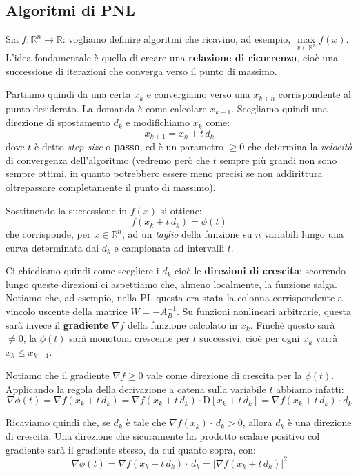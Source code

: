 \documentclass[a4paper,11pt]{article}
\begin{document}
\subsection{Algoritmi di PNL}
Sia $f: \mathbb{R}^n \rightarrow \mathbb{R}$: vogliamo definire algoritmi che ricavino, ad esempio, $\max\limits_{x \in \mathbb{R}^n} f(x)$.
L'idea fondamentale è quella di creare una \textbf{relazione di ricorrenza}, cioè una successione di iterazioni che converga verso il punto di massimo.

Partiamo quindi da una certa $x_k$ e convergiamo verso una $x_{k+n}$ corrispondente al punto desiderato.
La domanda è come calcolare $x_{k+1}$.
Scegliamo quindi una direzione di spostamento $d_k$ e modifichiamo $x_k$ come:
$$
x_{k + 1} = x_k + t \, d_k 
$$
dove $t$ è detto \textit{step size} o \textbf{passo}, ed è un parametro $\geq 0$ che determina la \textit{velocità} di convergenza dell'algoritmo (vedremo però che $t$ sempre più grandi non sono sempre ottimi, in quanto potrebbero essere meno precisi se non addirittura oltrepassare completamente il punto di massimo).

Sostituendo la successione in $f(x)$ si ottiene:
$$
f(x_k + t \, d_k) = \phi(t)
$$
che corrisponde, per $x \in \mathbb{R}^n$, ad un \textit{taglio} della funzione su $n$ variabili lungo una curva determinata dai $d_k$ e campionata ad intervalli $t$.

Ci chiediamo quindi come scegliere i $d_k$ cioè le \textbf{direzioni di crescita}: scorrendo lungo queste direzioni ci aspettiamo che, almeno localmente, la funzione salga.
Notiamo che, ad esempio, nella PL questa era stata la colonna corrispondente a vincolo uscente della matrice $W = -A_B^{-1}$. 
Su funzioni nonlineari arbitrarie, questa sarà invece il \textbf{gradiente} $\nabla f$ della funzione calcolato in $x_k$.
Finchè questo sarà $\neq 0$, la $\phi(t)$ sarà monotona crescente per $t$ successivi, cioè per ogni $x_k$ varrà $x_k \leq x_{k+1}$.

Notiamo che il gradiente $\nabla f \geq 0$ vale come direzione di crescita per la $\phi(t)$.
Applicando la regola della derivazione a catena sulla variabile $t$ abbiamo infatti:
$$
\nabla \phi(t) = \nabla f(x_k + t \, d_k) = \nabla f(x_k + t \, d_k) \cdot \mathrm{D} \left[x_k + t \, d_k\right] = \nabla f(x_k + t \, d_k) \cdot  d_k
$$

Ricaviamo quindi che, se $d_k$ è tale che $\nabla f(x_k) \cdot \, d_k > 0$, allora $d_k$ è una direzione di crescita.
Una direzione che sicuramente ha prodotto scalare positivo col gradiente sarà il gradiente stesso, da cui quanto sopra, con:
$$
\nabla \phi(t) = \nabla f(x_k + t \, d_k) \cdot \, d_k = |\nabla f(x_k + t \, d_k)|^2
$$
\end{document}
